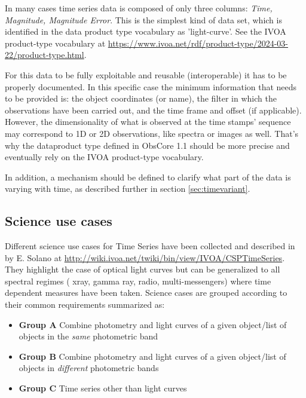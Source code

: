 \documentclass[11pt,a4paper]{ivoa}
\begin{document}
In many cases time series data is composed of only three columns: \emph{Time, Magnitude, Magnitude Error}.
This is the simplest kind of data set,  which is identified in the data product type vocabulary as 'light-curve'.
See the IVOA product-type vocabulary at \url{https://www.ivoa.net/rdf/product-type/2024-03-22/product-type.html}.

For this data to be fully exploitable and reusable (interoperable) it has to be properly documented. In this specific case the minimum information that needs to be provided is: the object coordinates (or name), the filter in which the observations have been carried out, and the time frame and offset (if applicable).
However, the dimensionality of what is observed at the time stamps' sequence may correspond to 1D or 2D observations, like spectra or images  as well.
That's why the dataproduct type  defined in ObsCore 1.1 should be more precise and eventually rely on the IVOA product-type vocabulary.

In addition, a mechanism should be defined to clarify what part of the data is varying with time, as described further in section \ref{sec:timevariant}.

\subsection{Science use cases}
\label{sect:usecases}
Different science use cases for Time Series have been collected and described in by E. Solano  at \url{http://wiki.ivoa.net/twiki/bin/view/IVOA/CSPTimeSeries}.
They highlight the case of optical light curves but can be generalized to all spectral regimes ( xray, gamma ray, radio, multi-messengers)  where time dependent measures have been taken.
Science cases are grouped according to their common requirements summarized as:
\begin{itemize}
\item \textbf{Group A} Combine photometry and light curves of a given object/list of objects in the \emph{same} photometric band
\item \textbf{Group B} Combine photometry and light curves of a given object/list of objects in \emph{different} photometric bands
\item \textbf{Group C} Time series other than light curves
\end{itemize}
\end{document}
